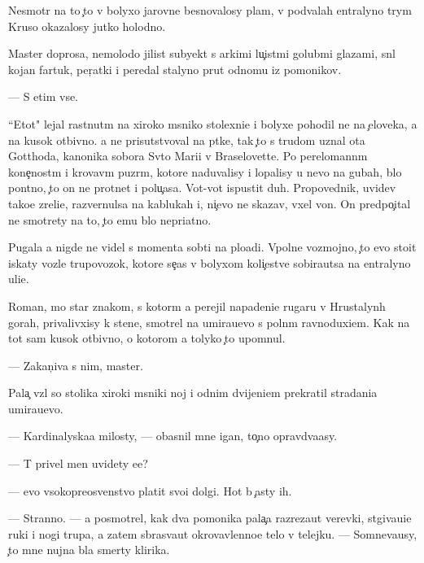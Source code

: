 \documentclass[10pt]{book}
\begin{document}
Nesmotr{\ia} na to {\c}to v bolyxo{\y} jarovne besnovalosy plam{\ia}, v podvalah {\q}entralyno{\y} t{\iu}rym{\yi} Kruso okazalosy jutko holodno.

Master doprosa, nemolodo{\y} jilist{\yi}{\y} subyekt s {\y}arkimi lu{\c}ist{\yi}mi golub{\yi}mi glazami, sn{\ia}l kojan{\yi}{\y} fartuk, per{\c}atki i peredal stalyno{\y} prut odnomu iz pomo{\x}nikov.

— S etim vse.

``Etot" lejal rast{\ia}nut{\yi}m na xiroko{\y} m{\ia}sni{\q}ko{\y} stolexni{\q}e i bolyxe pohodil ne na {\c}eloveka, a na kusok otbivno{\y}. {\Y}a ne prisutstvoval na p{\yi}tke, tak {\c}to s trudom uznal ot{\q}a Gotthoda, kanonika sobora Sv{\ia}to{\y} Mari{\y}i v Braselovette. Po perelomann{\yi}m kone{\c}nost{\ia}m i krovav{\yi}m puz{\yi}r{\ia}m, kotor{\yi}{\y}e naduvalisy i lopalisy u nevo na gubah, b{\yi}lo pon{\ia}tno, {\c}to on ne prot{\ia}net i polu{\c}asa. Vot-vot ispustit duh. Propovednik, uvidev tako{\y}e zreli{\x}e, razvernulsa na kablukah i, ni{\c}evo ne skazav, v{\yi}xel von. On predpo{\c}ital ne smotrety na to, {\c}to {\y}emu b{\yi}lo nepri{\y}atno.

Pugala {\y}a nigde ne videl s momenta sob{\yi}ti{\y} na plo{\x}adi. Vpolne vozmojno, {\c}to {\y}evo sto{\y}it iskaty vozle trupovozok, kotor{\yi}{\y}e se{\y}{\c}as v bolyxom koli{\c}estve sobira{\y}utsa na {\q}entralyno{\y} uli{\q}e.

Roman, mo{\y} star{\yi}{\y} znakom{\yi}{\y}, s kotor{\yi}m {\y}a perejil napadeni{\y}e rugaru v Hrustalyn{\yi}h gorah, privalivxisy k stene, smotrel na umira{\y}u{\x}evo s poln{\yi}m ravnoduxi{\y}em. Kak na tot sam{\yi}{\y} kusok otbivno{\y}, o kotorom {\y}a tolyko {\c}to upom{\ia}nul.

— Zakan{\c}iva{\y} s nim, master.

Pala{\c} vz{\ia}l so stolika xiroki{\y} m{\ia}sni{\q}ki{\y} noj i odnim dvijeni{\y}em prekratil stradani{\y}a umira{\y}u{\x}evo.

— Kardinalyska{\y}a milosty, — ob{\y}asnil mne {\q}igan, to{\c}no opravd{\yi}va{\y}asy.

— T{\yi} privel men{\ia} uvidety {\y}e{\y}e?

— {\Y}evo v{\yi}sokopreosv{\ia}{\x}enstvo platit svo{\y}i dolgi. Hot{\ia} b{\yi} {\c}asty ih.

— Stranno. — {\Y}a posmotrel, kak dva pomo{\x}nika pala{\c}a razreza{\y}ut verevki, st{\ia}giva{\y}u{\x}i{\y}e ruki i nogi trupa, a zatem sbras{\yi}va{\y}ut okrovavlenno{\y}e telo v telejku. — Somneva{\y}usy, {\c}to mne nujna b{\yi}la smerty klirika.
\end{document}
